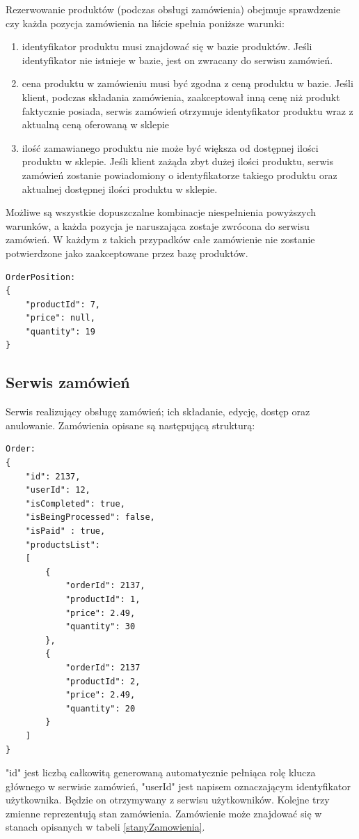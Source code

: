 \documentclass[11pt,a4paper,twoside]{article}
\begin{document}
Rezerwowanie produktów (podczas obsługi zamówienia) obejmuje sprawdzenie czy każda pozycja zamówienia na liście spełnia poniższe warunki:
\begin{enumerate}
\item identyfikator produktu musi znajdować się w bazie produktów. Jeśli identyfikator nie istnieje w bazie, jest on zwracany do serwisu zamówień.
\item cena produktu w zamówieniu musi być zgodna z ceną produktu w bazie. Jeśli klient, podczas składania zamówienia, zaakceptował inną cenę niż produkt faktycznie posiada, serwis zamówień otrzymuje identyfikator produktu wraz z aktualną ceną oferowaną w sklepie
\item ilość zamawianego produktu nie może być większa od dostępnej ilości produktu w sklepie. Jeśli klient zażąda zbyt dużej ilości produktu, serwis zamówień zostanie powiadomiony o identyfikatorze takiego produktu oraz aktualnej dostępnej ilości produktu w sklepie.
\end{enumerate}

Możliwe są wszystkie dopuszczalne kombinacje niespełnienia powyższych warunków, a każda pozycja je naruszająca zostaje zwrócona do serwisu zamówień. W każdym z takich przypadków całe zamówienie nie zostanie potwierdzone jako zaakceptowane przez bazę produktów.

\begin{lstlisting}
OrderPosition:
{
	"productId": 7,
    "price": null,
    "quantity": 19
}
\end{lstlisting}
\vspace{-20pt}
\subsection{Serwis zamówień}
Serwis realizujący obsługę zamówień; ich składanie, edycję, dostęp oraz anulowanie. Zamówienia opisane są następującą strukturą:

\begin{lstlisting}
Order:
{
	"id": 2137,
    "userId": 12,
    "isCompleted": true,
    "isBeingProcessed": false,
    "isPaid" : true,
    "productsList": 
    [
    	{
        	"orderId": 2137,
        	"productId": 1,
            "price": 2.49,
            "quantity": 30
        },
        {
        	"orderId": 2137
            "productId": 2,
            "price": 2.49,
            "quantity": 20
        }
    ]
}
\end{lstlisting}
\vspace{-20pt}
"id" jest liczbą całkowitą generowaną automatycznie pełniąca rolę klucza głównego w serwisie zamówień, "userId" jest napisem oznaczającym identyfikator użytkownika. Będzie on otrzymywany z serwisu użytkowników. Kolejne trzy zmienne reprezentują stan zamówienia. Zamówienie może znajdować się w stanach opisanych w tabeli \ref{stanyZamowienia}.
\end{document}
